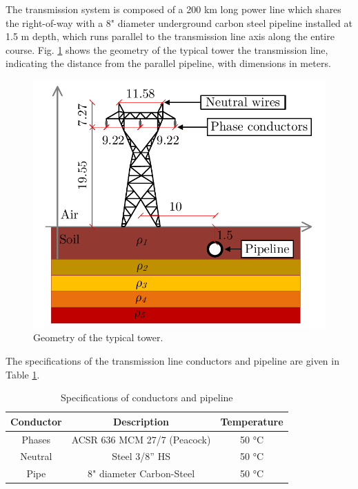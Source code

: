 \documentclass[conference]{IEEEtran}
\begin{document}
The transmission system is composed of a 200 km long power line which shares the right-of-way with a 8" diameter underground carbon steel pipeline installed at 1.5 m depth, which runs parallel to the transmission line axis along the entire course. Fig.  \ref{fig:SistTesteCorte} shows the geometry of the typical tower the transmission line, indicating the distance from the parallel pipeline, with dimensions in meters.

\begin{figure}[hbt]
	\begin{center}
		\includegraphics[width=.8\columnwidth]{fig/SistTesteCorte.pdf}
		\caption{Geometry of the typical tower.}
		\label{fig:SistTesteCorte}
	\end{center}
\end{figure}

The specifications of the transmission line conductors and pipeline are given in Table \ref{table:LTCond}.

\begin{table}[!hbt]
	\renewcommand{\arraystretch}{1.3}
	\caption{Specifications of conductors and pipeline}
	\label{table:LTCond}
	\centering
	\begin{tabular}{|c|c|c|}
		\hline
		\textbf{Conductor} & \textbf{Description} & \textbf{Temperature} \\
		\hline
		Phases & ACSR 636 MCM 27/7 (Peacock) & 50 °C\\
		\hline
		Neutral & Steel 3/8” HS & 50 °C\\
		\hline
		Pipe & 8" diameter Carbon-Steel & 50 °C\\
		\hline
	\end{tabular}
\end{table}
\end{document}
